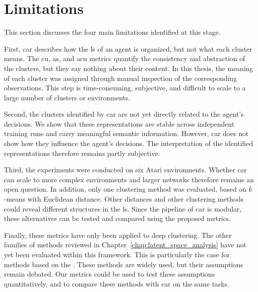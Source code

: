 \section{Limitations}
\label{sec:conclusion_limitations}

This section discusses the four main limitations identified at this stage.

First, \gls{car} describes how the \gls{ls} of an agent is organized, but not what each cluster means.
The \gls{cu}, \gls{as}, and \gls{acu} metrics quantify the consistency and abstraction of the clusters, but they say nothing about their content.
In this thesis, the meaning of each cluster was assigned through manual inspection of the corresponding observations.
This step is time-consuming, subjective, and difficult to scale to a large number of clusters or environments.

Second, the clusters identified by \gls{car} are not yet directly related to the agent's decisions.
We show that these representations are stable across independent training runs and carry meaningful semantic information.
However, \gls{car} does not show how they influence the agent's decisions.
The interpretation of the identified representations therefore remains partly subjective.

Third, the experiments were conducted on six Atari environments.
Whether \gls{car} can scale to more complex environments and larger networks therefore remains an open question.
In addition, only one clustering method was evaluated, based on $k$-means with Euclidean distance.
Other distances and other clustering methods could reveal different structures in the \gls{ls}.
Since the pipeline of \gls{car} is modular, these alternatives can be tested and compared using the proposed metrics.

Finally, these metrics have only been applied to deep clustering.
The other families of methods reviewed in Chapter~\ref{chap:latent_space_analysis} have not yet been evaluated within this framework.
This is particularly the case for methods based on the \SuperpositionHypothesisName.
These methods are widely used, but their assumptions remain debated.
Our metrics could be used to test these assumptions quantitatively, and to compare these methods with \gls{car} on the same tasks.
